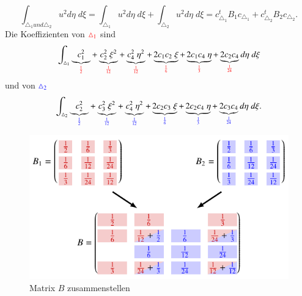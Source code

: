 \begin{equation}
\int_{\triangle_1 und \triangle_2} u^2 d\eta \; d\xi = \int_{\triangle_1} u^2 d\eta \; d\xi + \int_{\triangle_2} u^2 d\eta \; d\xi = c_{\triangle_1}^t B_1 c_{\triangle_1} + c_{\triangle_2}^t B_2 c_{\triangle_2}.
\end{equation}
Die Koeffizienten von $\textcolor{red}{\triangle_1}$ sind
\begin{equation}
\int_{\triangle_1} \underbrace{c_1^2}_{\textcolor{red}{\frac{1}{2}}} + \underbrace{c_2^2 \; \xi^2}_{\textcolor{red}{\frac{1}{12}}} + \underbrace{c_4^2 \; \eta^2}_{\textcolor{red}{\frac{1}{12}}} + \underbrace{2 c_1 c_2\; \xi}_{\textcolor{red}{\frac{1}{6}}} + \underbrace{2 c_1 c_4 \; \eta}_{\textcolor{red}{\frac{1}{3}}} + \underbrace{2 c_2 c_4}_{\textcolor{red}{\frac{1}{24}}} d\eta \; d\xi
\label{fem:roteKoeffizienten}
\end{equation}
und von $\textcolor{blue}{\triangle_2}$ 
\begin{equation}
\int_{\triangle_2} \underbrace{c_2^2}_{\textcolor{blue}{\frac{1}{2}}} + \underbrace{c_3^2 \; \xi^2}_{\textcolor{blue}{\frac{1}{12}}} + \underbrace{c_4^2 \; \eta^2}_{\textcolor{blue}{\frac{1}{12}}} + \underbrace{2 c_2 c_3 \; \xi}_{\textcolor{blue}{\frac{1}{6}}} + \underbrace{2 c_2 c_4 \; \eta}_{\textcolor{blue}{\frac{1}{3}}} + \underbrace{2 c_3 c_4}_{\textcolor{blue}{\frac{1}{24}}} d\eta \; d\xi.
\label{fem:blaueKoeffizienten}
\end{equation}
\begin{figure}
\centering
\includegraphics{papers/fem/Images/matrizen.pdf}
\caption{Matrix $B$ zusammenstellen }
\label{fem:MatrixBKomplett}
\end{figure}

